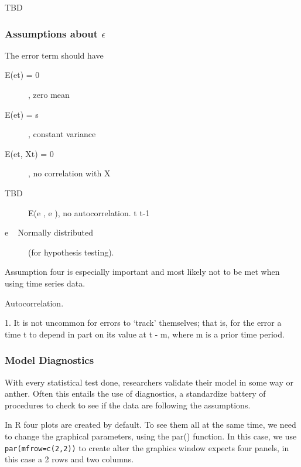 \documentclass{article}\usepackage[]{graphicx}\usepackage[]{color}
\begin{document}
TBD



\subsubsection{Assumptions about $\epsilon$}

The error term should have 

\begin{description}
  \item [E(et) = 0], zero mean

  \item[E(et) = s], constant variance

  \item[E(et, Xt) = 0] , no correlation with X 

  \item[TBD] E(e , e ), no autocorrelation. t t-1

  \item[e ~ Normally distributed] (for hypothesis testing). 

\end{description}

Assumption four is especially important and most likely not to be met when using time series data.

Autocorrelation.

1. It is not uncommon for errors to `track' themselves; that is, for the error a time t to depend in part on its value at t - m, where m is a prior time period.

\subsubsection{Model Diagnostics}

With every statistical test done, researchers validate their model in some way or anther. Often this entails the use of diagnostics, a standardize battery of procedures to check to see if the data are following the assumptions. 

In R four plots are created by default.  To see them all at the same time, we need to change the graphical parameters, using the par() function. In this case, we use \texttt{par(mfrow=c(2,2))} to create alter the graphics window expects four panels, in this case a 2 rows and two columns.
\end{document}
